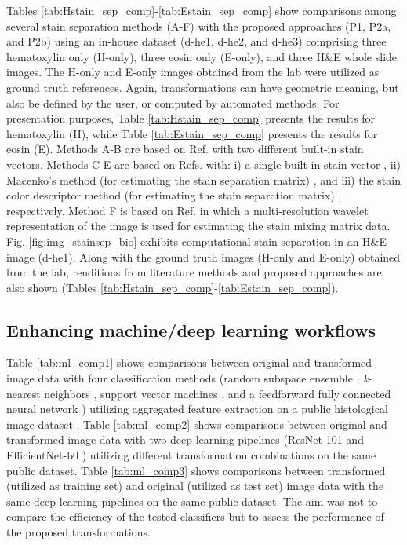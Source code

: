 \documentclass[superscriptaddress,longbibliography,aps,prl,twocolumn,10pt]{revtex4-2}
\begin{document}
Tables \ref{tab:Hstain_sep_comp}-\ref{tab:Estain_sep_comp} show comparisons among several stain separation methods (A-F) with the proposed approaches (P1, P2a, and P2b) using an in-house dataset (d-he1, d-he2, and d-he3) comprising three hematoxylin only (H-only), three eosin only (E-only), and three H\&E whole slide images. The H-only and E-only images obtained from the lab were utilized as ground truth references. Again, transformations can have geometric meaning, but also be defined by the user, or computed by automated methods. For presentation purposes, Table \ref{tab:Hstain_sep_comp} presents the results for hematoxylin (H), while Table \ref{tab:Estain_sep_comp} presents the results for eosin (E). Methods A-B are based on Ref. \cite{Ruifrok2001} with two different built-in stain vectors. Methods C-E are based on Refs. \cite{Khan2014, stain_normalisation_toolbox_v2_2} with: i) a single built-in stain vector \cite{Ruifrok2001}, ii) Macenko's method (for estimating the stain separation matrix) \cite{Macenko2009}, and iii) the stain color descriptor method (for estimating the stain separation matrix) \cite{Khan2014, stain_normalisation_toolbox_v2_2}, respectively. Method F is based on Ref. \cite{Alsubaie2017} in which a multi-resolution wavelet representation of the image is used for estimating the stain mixing matrix data. Fig. \ref{fig:img_stainsep_bio} exhibits computational stain separation in an H\&E image (d-he1). Along with the ground truth images (H-only and E-only) obtained from the lab, renditions from literature methods and proposed approaches are also shown (Tables \ref{tab:Hstain_sep_comp}-\ref{tab:Estain_sep_comp}).

\subsection*{\normalsize{Enhancing machine/deep learning workflows}}
Table \ref{tab:ml_comp1} shows comparisons between original and transformed image data with four classification methods (random subspace ensemble \cite{TinKamHo1998}, \textit{k}-nearest neighbors \cite{Sproull1991}, support vector machines \cite{ChihWeiHsu2002}, and a feedforward fully connected neural network \cite{Liu1989}) utilizing aggregated feature extraction on a public histological image dataset \cite{Kather2016}. Table \ref{tab:ml_comp2} shows comparisons between original and transformed image data with two deep learning pipelines (ResNet-101 \cite{HeZRS15} and EfficientNet-b0 \cite{Tan2019EfficientNetRM}) utilizing different transformation combinations on the same public dataset. Table \ref{tab:ml_comp3} shows comparisons between transformed (utilized as training set) and original (utilized as test set) image data with the same deep learning pipelines on the same public dataset. The aim was not to compare the efficiency of the tested classifiers but to assess the performance of the proposed transformations.
\end{document}
